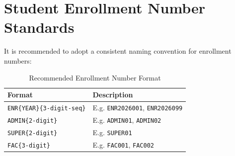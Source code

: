 \section{Student Enrollment Number Standards}

It is recommended to adopt a consistent naming convention for enrollment numbers:

\begin{table}[h!]
\centering
\caption{Recommended Enrollment Number Format}
\label{tab:enrollment-format}
\begin{tabularx}{\textwidth}{lX}
\toprule
\textbf{Format} & \textbf{Description}\\
\midrule
\texttt{ENR\{YEAR\}\{3-digit-seq\}} & E.g. \texttt{ENR2026001}, \texttt{ENR2026099}\\
\rowcolor{aurxonlightgray}
\texttt{ADMIN\{2-digit\}} & E.g. \texttt{ADMIN01}, \texttt{ADMIN02}\\
\texttt{SUPER\{2-digit\}} & E.g. \texttt{SUPER01}\\
\rowcolor{aurxonlightgray}
\texttt{FAC\{3-digit\}} & E.g. \texttt{FAC001}, \texttt{FAC002}\\
\bottomrule
\end{tabularx}
\end{table}

